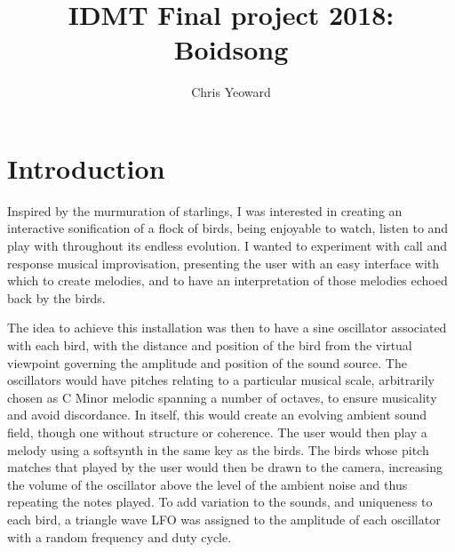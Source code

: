 \documentclass[journal, a4paper]{IEEEtran}
\begin{document}
\title{IDMT Final project 2018: Boidsong}
\author{Chris Yeoward}
\maketitle

\section*{Introduction}
Inspired by the murmuration of starlings, I was interested in creating an interactive sonification of a flock of birds, being enjoyable to watch, listen to and play with throughout its endless evolution. I wanted to experiment with call and response musical improvisation, presenting the user with an easy interface with which to create melodies, and to have an interpretation of those melodies echoed back by the birds.

The idea to achieve this installation was then to have a sine oscillator associated with each bird, with the distance and position of the bird from the virtual viewpoint governing the amplitude and position of the sound source. The oscillators would have pitches relating to a particular musical scale, arbitrarily chosen as C Minor melodic spanning a number of octaves, to ensure musicality and avoid discordance. In itself, this would create an evolving ambient sound field, though one without structure or coherence. The user would then play a melody using a softsynth in the same key as the birds. The birds whose pitch matches that played by the user would then be drawn to the camera, increasing the volume of the oscillator above the level of the ambient noise and thus repeating the notes played. To add variation to the sounds, and uniqueness to each bird, a triangle wave LFO was assigned to the amplitude of each oscillator with a random frequency and duty cycle.
\end{document}
